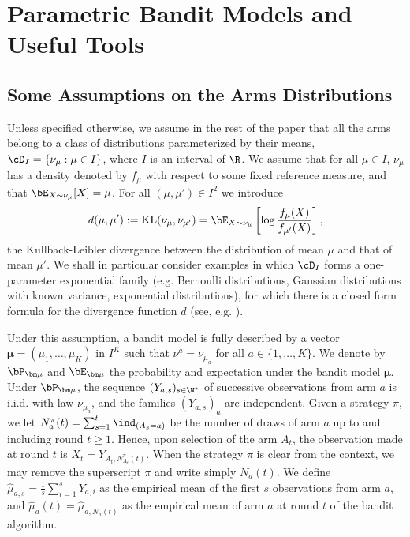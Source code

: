 \documentclass[proc]{edpsmath}
\begin{document}
	
	
	
	\section{Parametric Bandit Models and Useful Tools} \label{sec:Tools}
	
	\subsection{Some Assumptions on the Arms Distributions} \label{subsec:Model}
	
	Unless specified otherwise, we assume in the rest of the paper that all the arms belong to a class of distributions parameterized by their means, $\cD_{I} = \{ \nu_{\mu} : \mu \in I\}$, where $I$ is an interval of $\R$. We assume that for all $\mu \in I$, $\nu_{\mu}$ has a density denoted by $f_{\mu}$ with respect to some fixed reference measure, and that $\bE_{X \sim \nu_\mu}[X] = \mu$. For all $(\mu,\mu') \in I^2$ we introduce
	\[d(\mu,\mu') := \mathrm{KL}(\nu_{\mu},\nu_{\mu'}) = \bE_{X \sim \nu_\mu}\left[\log \frac{f_{\mu}(X)}{f_{\mu'}(X)}\right],\]
	the Kullback-Leibler divergence between the distribution of mean $\mu$ and that of mean $\mu'$. We shall in particular consider examples in which $\cD_{I}$ forms a one-parameter exponential family (e.g. Bernoulli distributions, Gaussian distributions with known variance, exponential distributions), for which there is a closed form formula for the divergence function $d$ (see, e.g. \cite{KLUCBJournal}). 
	
	Under this assumption, a bandit model is fully described by a vector $\bm \mu = (\mu_1,\dots,\mu_K)$ in $I^K$ such that $\nu^{a} = \nu_{\mu_a}$ for all $a \in \{1,\dots,K\}$.  We denote by $\bP_{\bm \mu}$ and $\bE_{\bm \mu}$ the probability and expectation under the bandit model $\bm \mu$.
	Under $\bP_{\bm \mu}$, the sequence $(Y_{a,s})_{s\in \N^*}$ of successive observations from arm $a$ is i.i.d. with law $\nu_{\mu_a}$, and the families $(Y_{a,s})_a$  are independent. Given a strategy $\pi$, we let $N_a^\pi(t) = \sum_{s=1}^t\ind_{(A_s=a)}$ be the number of draws of arm $a$ up to and including round $t\geq 1$. Hence, upon selection of the arm $A_t$, the observation made at round $t$ is $X_t = Y_{A_t,N_{A_t}^\pi(t)}$. When the strategy $\pi$ is clear from the context, we may remove the superscript $\pi$ and write simply $N_a(t)$. We define $\hat{\mu}_{a,s}= \frac{1}{s}\sum_{i=1}^s Y_{a,i}$ as the empirical mean of the first $s$ observations from arm $a$, and $\hat{\mu}_a(t) = \hat{\mu}_{a,N_a(t)}$ as the empirical mean of arm $a$ at round $t$ of the bandit algorithm.
	
\end{document}
